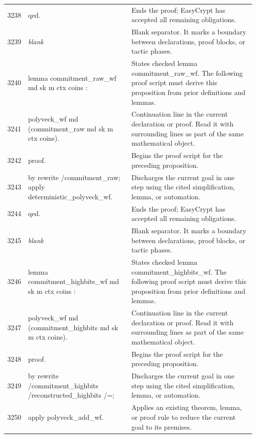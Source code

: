 \documentclass[10pt]{article}
\begin{document}
\begin{longtable}{r L{0.53\textwidth} L{0.37\textwidth}}
3238 & {\ttfamily\scriptsize qed.} & Ends the proof; EasyCrypt has accepted all remaining obligations. \\
3239 & {\ttfamily\scriptsize \emph{blank}} & Blank separator.  It marks a boundary between declarations, proof blocks, or tactic phases. \\
3240 & {\ttfamily\scriptsize lemma commitment\_raw\_wf md sk m ctx coins :} & States checked lemma commitment\_raw\_wf.  The following proof script must derive this proposition from prior definitions and lemmas. \\
3241 & {\ttfamily\scriptsize   polyveck\_wf md (commitment\_raw md sk m ctx coins).} & Continuation line in the current declaration or proof.  Read it with surrounding lines as part of the same mathematical object. \\
3242 & {\ttfamily\scriptsize proof.} & Begins the proof script for the preceding proposition. \\
3243 & {\ttfamily\scriptsize by rewrite /commitment\_raw; apply deterministic\_polyveck\_wf.} & Discharges the current goal in one step using the cited simplification, lemma, or automation. \\
3244 & {\ttfamily\scriptsize qed.} & Ends the proof; EasyCrypt has accepted all remaining obligations. \\
3245 & {\ttfamily\scriptsize \emph{blank}} & Blank separator.  It marks a boundary between declarations, proof blocks, or tactic phases. \\
3246 & {\ttfamily\scriptsize lemma commitment\_highbits\_wf md sk m ctx coins :} & States checked lemma commitment\_highbits\_wf.  The following proof script must derive this proposition from prior definitions and lemmas. \\
3247 & {\ttfamily\scriptsize   polyveck\_wf md (commitment\_highbits md sk m ctx coins).} & Continuation line in the current declaration or proof.  Read it with surrounding lines as part of the same mathematical object. \\
3248 & {\ttfamily\scriptsize proof.} & Begins the proof script for the preceding proposition. \\
3249 & {\ttfamily\scriptsize by rewrite /commitment\_highbits /reconstructed\_highbits /=;} & Discharges the current goal in one step using the cited simplification, lemma, or automation. \\
3250 & {\ttfamily\scriptsize    apply polyveck\_add\_wf.} & Applies an existing theorem, lemma, or proof rule to reduce the current goal to its premises. \\

\end{longtable}
\end{document}
